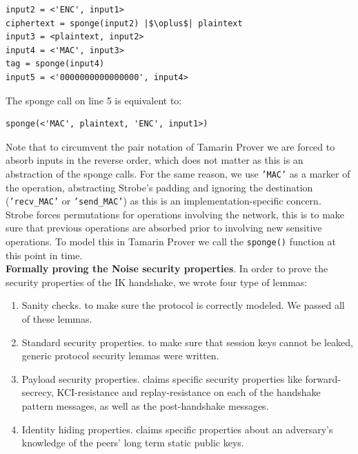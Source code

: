 \documentclass{article}
\begin{document}
\begin{verbatim}
input2 = <'ENC', input1>
ciphertext = sponge(input2) |$\oplus$| plaintext
input3 = <plaintext, input2>
input4 = <'MAC', input3>
tag = sponge(input4)
input5 = <'0000000000000000', input4>
\end{verbatim}

The sponge call on line 5 is equivalent to:

\begin{verbatim}
sponge(<'MAC', plaintext, 'ENC', input1>)
\end{verbatim}

Note that to circumvent the pair notation of Tamarin Prover we are forced to absorb inputs in the reverse order, which does not matter as this is an abstraction of the sponge calls. For the same reason, we use \texttt{'MAC'} as a marker of the operation, abstracting Strobe's padding and ignoring the destination (\texttt{'recv_MAC'} or \texttt{'send_MAC'}) as this is an implementation-specific concern.\\

Strobe forces permutations for operations involving the network, this is to make sure that previous operations are absorbed prior to involving new sensitive operations. To model this in Tamarin Prover we call the \texttt{sponge()} function at this point in time.\\

\textbf{Formally proving the Noise security properties}. In order to prove the security properties of the IK handshake, we wrote four type of lemmas:

\begin{enumerate}
    \item Sanity checks. to make sure the protocol is correctly modeled. We passed all of these lemmas.
    \item Standard security properties. to make sure that session keys cannot be leaked, generic protocol security lemmas were written.
    \item Payload security properties. \cite[Section 7.7 of the Noise Protocol Framework]{noise} claims specific security properties like forward-secrecy, KCI-resistance and replay-resistance on each of the handshake pattern messages, as well as the post-handshake messages.
    \item Identity hiding properties. \cite[Section 7.8 of the Noise Protocol Framework]{noise} claims specific properties about an adversary's knowledge of the peers' long term static public keys.
\end{enumerate}
\end{document}
